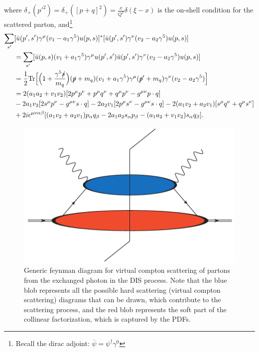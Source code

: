 \documentclass[aps,prd,amsmath,superscriptaddress,floatfix,nofootinbib]{revtex4-2}
\begin{document}
where $\displaystyle \delta_{+}(p'^2) = \delta_{+}([p+q]^2) = \frac{x}{Q^2}\delta(\xi - x)$ is the on-shell condition for the scattered parton, and\footnote{Recall the dirac adjoint: $\overline{\psi} = \psi^{\dagger} \gamma^{0}$}
\begin{eqnarray}
    \label{eq:generic-tensor-structure}
    \begin{aligned} 
        \sum_{s'} &[ \bar{u}(p',s') \gamma^{\mu} (v_1 - a_1 \gamma^{5}) u(p,s) ]^{*}[ \bar{u}(p',s') \gamma^{\nu} (v_2 - a_2 \gamma^{5}) u(p,s) ] \\
                  &= \sum_{s'} [ \bar{u}(p,s) (v_1 + a_1 \gamma^{5}) \gamma^{\mu} u(p',s') \bar{u}(p',s') \gamma^{\nu} (v_2 - a_2 \gamma^{5}) u(p,s) ] \\
                  &= \frac{1}{2}{\rm Tr} \Big[ \Big( 1 + \frac{\gamma^{5} \slashed{s}}{m_{q}} \Big) ( \slashed{p} + m_{q} ) ( v_1 + a_1 \gamma^{5} ) \gamma^{\mu} (\slashed{p}' + m_{q} ) \gamma^{\nu} ( v_2 - a_2 \gamma^{5} ) \Big] \\
                  &= 2 ( a_1 a_2 + v_1v_2 )[ 2 p^{\mu}p^{\nu} + p^{\mu}q^{\nu} + q^{\mu}p^{\nu}  - g^{\mu\nu} p \cdot q ] \\
                  &- 2 a_1v_2 [ 2s^{\mu}p^{\nu} - g^{\mu\nu} s \cdot q ] - 2 a_2v_1 [ 2p^{\mu}s^{\nu} - g^{\mu\nu} s \cdot q ] - 2 ( a_1v_2 + a_2v_1 ) [ s^{\mu}q^{\nu} + q^{\mu}s^{\nu} ] \\
                  &+ 2i\epsilon^{\mu\nu\alpha\beta} [ ( a_1v_2 + a_2v_1 ) p_{\alpha}q_{\beta} - 2 a_1a_2 s_{\alpha}p_{\beta} - ( a_1a_2 + v_1v_2 ) s_{\alpha}q_{\beta} ]
    .\end{aligned}
\end{eqnarray}

\begin{figure}[h!tb]
\begin{center} 
    \includegraphics[width=0.4\paperwidth]{DIS_parton_model.pdf}
    \caption{Generic feynman diagram for virtual compton scattering of partons from the exchanged photon in the DIS process. Note that the blue blob represents all the possible hard scattering (virtual compton scattering) diagrams that can be drawn, which contribute to the scattering process, and the red blob represents the soft part of the collinear factorization, which is captured by the PDFs.}
    \label{fig:virtual-compton-scattering}
\end{center}
\end{figure}
\end{document}

